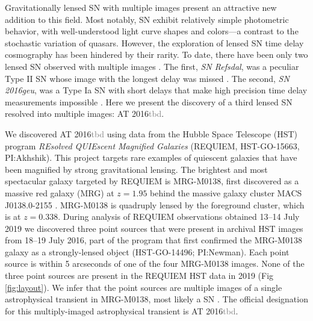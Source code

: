 \documentclass[12pt,dvipsnames]{article}
\def\SNABC{AT 2016{\textcolor{Gray}{tbd}}\xspace}
\begin{document}
Gravitationally lensed SN with multiple images present an attractive new addition to this field. Most notably, SN exhibit relatively simple photometric behavior, with well-understood light curve shapes and colors---a contrast to the stochastic variation of quasars.  However, the exploration of lensed SN time delay cosmography has been hindered by their rarity.  To date, there have been only two lensed SN observed with multiple images \cite{kelly_multiple_2015,goobar_iptf16geu:_2017}. The first, {\it SN Refsdal}, was a peculiar Type II SN whose image with the longest delay was missed \cite{kelly_sn_2016}. The second, {\it SN 2016geu}, was a Type Ia SN with short delays that make high precision time delay measurements impossible \cite{dhawan_magnification_2019}. Here we present the discovery 
of a third lensed SN resolved into multiple images: \SNABC. 

We discovered \SNABC using data from the Hubble Space Telescope (HST) program {\it REsolved QUIEscent Magnified Galaxies} (REQUIEM, HST-GO-15663, PI:Akhshik). This project targets rare examples of quiescent galaxies that have been magnified by strong gravitational lensing. %
The brightest and most spectacular galaxy targeted by REQUIEM
is MRG-M0138, first discovered as a massive red galaxy (MRG) at $z=1.95$ \cite{newman_resolving_2018} behind the massive galaxy cluster MACS J0138.0-2155 \cite{ebeling_macs_2001}.
MRG-M0138 is quadruply lensed by the foreground cluster, which is at $z=0.338$.  
During analysis of REQUIEM observations obtained 13--14 July 2019 \cite{materials_methods_2020} we discovered three point 
sources that were present in archival HST images from 18--19 July 2016, part of the program 
that first confirmed the MRG-M0138 galaxy as a strongly-lensed object (HST-GO-14496; PI:Newman). 
Each point source is within 5 arcseconds of one of the four MRG-M0138 images.  None of the
three point sources are present in the REQUIEM HST data in 2019 (Fig \ref{fig:layout}). We infer that 
the point sources are multiple images of a single astrophysical 
transient in MRG-M0138, most likely a SN \cite{materials_methods_2020}.  
The official designation for this multiply-imaged astrophysical transient is \SNABC.
\end{document}

